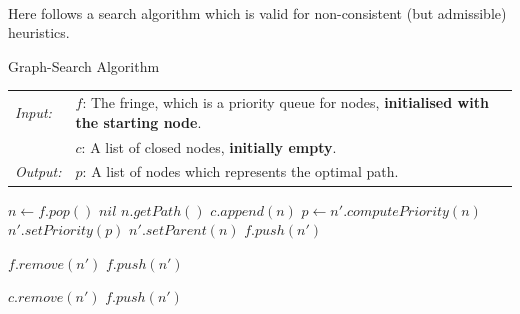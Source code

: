 \documentclass[9pt,a4paper]{extarticle}
\newenvironment{solution}
    {%
    \color{red}
    }
    { 
    \color{black}
    }
\begin{document}
    \begin{solution}
    \\
    Here follows a search algorithm which is valid for non-consistent (but admissible) heuristics.
\begin{algorithm}[H]
\caption{Graph-Search Algorithm}\label{algo:GS}
\begin{tabular}{ll}
    \textit{Input:}  & $f$: The fringe, which is a priority queue for nodes, \textbf{initialised with the starting node}. \\
     & $c$: A list of closed nodes, \textbf{initially empty}.\\
     \textit{Output:}  & $p$: A list of nodes which represents the optimal path.\\
\end{tabular}
\small
\begin{algorithmic}[1]
\State $n \gets f.pop()$ %
 \State \Return $nil$
\EndIf
{}
   \State \Return $n.getPath()$
\EndIf
\State $c.append(n)$
    \State $p \gets n'.computePriority(n)$
    \State $n'.setPriority(p)$
    \State $n'.setParent(n)$
    \State $f.push(n')$
    
    \State $f.remove(n')$
    \State $f.push(n')$
    
    \State $c.remove(n')$
    \State $f.push(n')$
    \EndIf
\EndFor
\EndWhile
\EndProcedure
\end{algorithmic}
\vspace{1em}
\end{algorithm}
    \end{solution}
\end{document}
